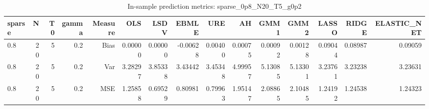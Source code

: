 \begin{table}[!htbp]\centering
\caption{In-sample prediction metrics: sparse_0p8_N20_T5_g0p2}
\label{tab:table2_sparse_0p8_N20_T5_g0p2}
\begin{tabular}{lrrrrrrrrrrrrrr}
\hline
sparse & N & T0 & gamma & Measure & OLS & LSDV & EBMLE & URE & AH & GMM1 & GMM2 & LASSO & RIDGE & ELASTIC_NET \\
\hline
0.8 & 20 & 5 & 0.2 & Bias & 0.00000 & 0.00000 & -0.00628 & 0.00400 & 0.00075 & 0.00092 & 0.00128 & 0.09044 & 0.08987 & 0.09059 \\
0.8 & 20 & 5 & 0.2 & Var & 3.28297 & 3.85338 & 3.43442 & 3.45348 & 4.99957 & 5.13085 & 5.13301 & 3.23761 & 3.23238 & 3.23631 \\
0.8 & 20 & 5 & 0.2 & MSE & 1.25858 & 0.69529 & 0.80981 & 0.79963 & 1.95147 & 2.08865 & 2.10485 & 1.24192 & 1.24538 & 1.24323 \\
\hline
\end{tabular}
\end{table}

